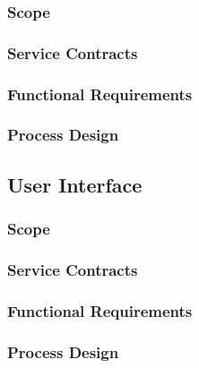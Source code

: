 \documentclass[11pt]{article}
\begin{document}
\subsubsection{Scope}
\subsubsection{Service Contracts}
\subsubsection{Functional Requirements}
\subsubsection{Process Design}

\subsection{User Interface}
\subsubsection{Scope}
\subsubsection{Service Contracts}
\subsubsection{Functional Requirements}
\subsubsection{Process Design}
\end{document}
